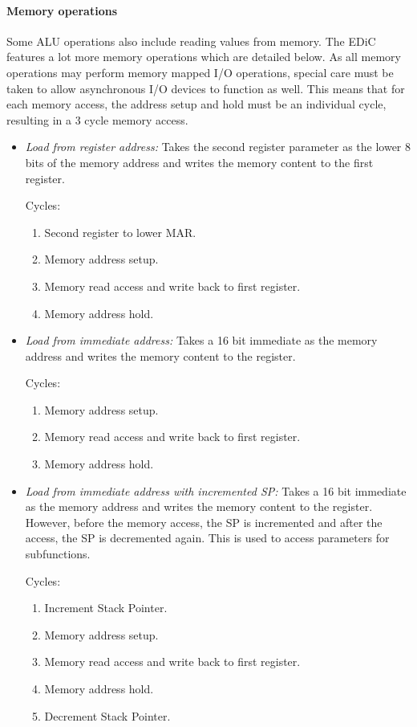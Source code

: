 \paragraph{Memory operations} Some \gls{ALU} operations also include reading values from memory.
The \gls{EDiC} features a lot more memory operations which are detailed below.
As all memory operations may perform memory mapped I/O operations, special care must be taken to allow asynchronous I/O devices to function as well.
This means that for each memory access, the address setup and hold must be an individual cycle, resulting in a 3 cycle memory access.
\begin{itemize}
  \item \emph{Load from register address:} Takes the second register parameter as the lower 8 bits of the memory address and writes the memory content to the first register.

  Cycles:
  \begin{enumerate}
    \item Second register to lower \gls{MAR}.
    \item Memory address setup.
    \item Memory read access and write back to first register.
    \item Memory address hold.
  \end{enumerate}

  \item \emph{Load from immediate address:} Takes a 16 bit immediate as the memory address and writes the memory content to the register.

  Cycles:
  \begin{enumerate}
    \item Memory address setup.
    \item Memory read access and write back to first register.
    \item Memory address hold.
  \end{enumerate}

  \item \emph{Load from immediate address with incremented \gls{SP}:} Takes a 16 bit immediate as the memory address and writes the memory content to the register.
  However, before the memory access, the \gls{SP} is incremented and after the access, the \gls{SP} is decremented again.
  This is used to access parameters for subfunctions.

  Cycles:
  \begin{enumerate}
    \item Increment Stack Pointer.
    \item Memory address setup.
    \item Memory read access and write back to first register.
    \item Memory address hold.
    \item Decrement Stack Pointer.
  \end{enumerate}


\end{itemize}
